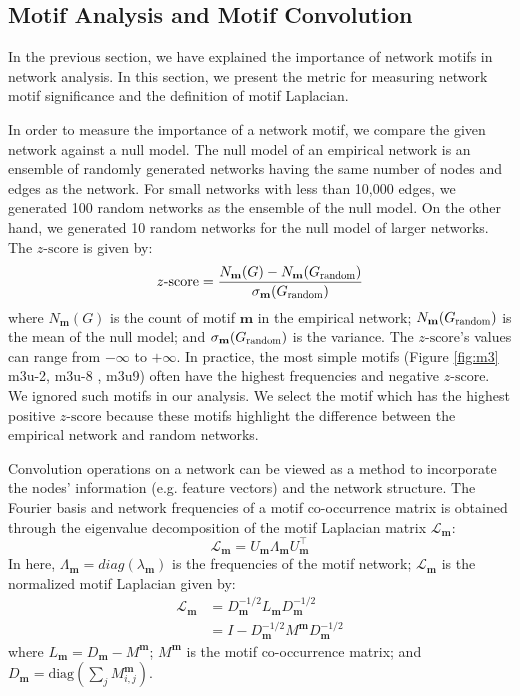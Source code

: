 \documentclass{article}
\theoremstyle{definition}
\begin{document}
\subsection{Motif Analysis and Motif Convolution}

In the previous section, we have explained the importance of
network motifs in network analysis. In this section, we present
the metric for measuring network motif significance and the definition
of motif Laplacian.

In order to measure the importance of a network motif, we compare
the given network against a null model. The null model of an empirical 
network is an ensemble of randomly generated networks having the same 
number of nodes and edges as the network. For small networks with less 
than 10,000 edges, we generated 100 random networks as the ensemble of the 
null model. On the other hand, we generated 10 random networks for the 
null model of larger networks. The $z\mbox{-score}$ is given by:
\begin{equation*}
z\mbox{-score} = \frac{N_\mathbf{m}(G)-N_\mathbf{m}(G_{\scalebox{0.75}{random}})}{\sigma_\mathbf{m}(G_{\scalebox{0.75}{random}})}
\end{equation*}
where $N_\mathbf{m}(G)$ is the count of motif $\mathbf{m}$ in the 
empirical network; $N_\mathbf{m}(G_{\scalebox{0.75}{random}})$ is the mean 
of the null model; and $\sigma_\mathbf{m}(G_{\scalebox{0.75}{random}})$ is
the variance. The $z\mbox{-score}$'s values can range from 
$-\infty$ to $+\infty$. In practice, the most simple motifs (Figure 
\ref{fig:m3} m3u-2, m3u-8 , m3u9) often have the highest frequencies 
and negative $z \mbox{-score}$. We ignored such motifs in our analysis. 
We select the motif which has the highest positive $z\mbox{-score}$ because 
these motifs highlight the difference between the empirical network and random 
networks. 

Convolution operations on a network can be viewed as a method to
incorporate the nodes' information (e.g. feature vectors) 
and the network structure. The Fourier basis and network frequencies of
a motif co-occurrence matrix is obtained through the eigenvalue
decomposition of the motif Laplacian matrix $\mathcal{L}_{\mathbf{m}}$:
\begin{equation} \label{eq:eigm}
\mathcal{L}_{\mathbf{m}} = U_{\mathbf{m}} \Lambda_{\mathbf{m}} 
U^{\top}_{\mathbf{m}}
\end{equation}
In here, $\Lambda_{\mathbf{m}} = diag(\lambda_{\mathbf{m}})$ is the 
frequencies of the motif network; $\mathcal{L}_{\mathbf{m}}$ is the 
normalized motif Laplacian given by:
\begin{equation} 
\begin{aligned}
\mathcal{L}_{\mathbf{m}} &= D_{\mathbf{m}}^{-1/2} L_{\mathbf{m}} 
D_{\mathbf{m}}^{-1/2} \\
&= I - D_{\mathbf{m}}^{-1/2} M^{\mathbf{m}} D_{\mathbf{m}}^{-1/2}
\end{aligned}
\label{eq:eigm}
\end{equation}
where $L_{\mathbf{m}} = D_{\mathbf{m}} - M^{\mathbf{m}}$; $M^{\mathbf{m}}$
is the motif co-occurrence matrix; and $D_{\mathbf{m}} = \mbox{diag} 
( \sum_j M^{\mathbf{m}}_{i,j} )$.
\end{document}
